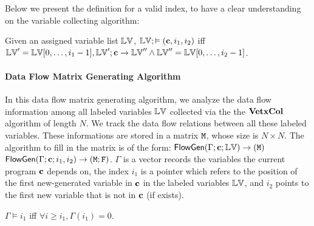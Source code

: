 %
Below we present the definition for a valid index, to have a clear understanding on the variable collecting algorithm:
%
%
{
\begin{defn}
Given an assigned variable list $\mathbb{LV}$, $\mathbb{LV}; \vDash ({\boldsymbol{\mathbf{c}}},i_1,i_2)$ iff 
$\mathbb{LV}' = \mathbb{LV}[0,\ldots, i_1-1], \mathbb{LV}';{\boldsymbol{\mathbf{c}}} \to \mathbb{LV}'' \land \mathbb{LV}'' = \mathbb{LV}[0, \ldots, i_2-1] $.  
\end{defn}}
%
%
\paragraph{Data Flow Matrix Generating Algorithm}
%
In this data flow matrix generating algorithm, we analyze the data flow information among all labeled variables $\mathbb{LV}$ collected via the the $\bf{VetxCol}$ algorithm of length $N$.
%
We track the data flow relations between all these labeled variables. These informations are stored in a matrix $\mathtt{M}$, whose size is $N \times N$. 
%
The algorithm to fill in the matrix is of the form: 
{$\mathsf{FlowGen}{(\Gamma ; {\boldsymbol{\mathbf{c}}} ; \mathbb{LV})}\to {(\ensuremath{\mathtt{M}})}$}
$\mathsf{FlowGen}{(\Gamma ; {\boldsymbol{\mathbf{c}}} ; i_1, i_2)}\to {(\ensuremath{\mathtt{M}}; \ensuremath{\mathtt{F}})}$. 
$\Gamma$ is a vector records the variables the current program ${\boldsymbol{\mathbf{c}}}$ depends on, the index $i_1$ is a pointer which refers to the position of the first new-generated variable in ${\boldsymbol{\mathbf{c}}}$ in the labeled variables $\mathbb{LV}$, and $i_2$ points to the first new variable that is not in ${\boldsymbol{\mathbf{c}}}$ (if exists). 
%
%
{
\begin{defn}
$\Gamma \vDash i_1$ iff $\forall i \geq i_1, \Gamma(i_1)=0 $.  
\end{defn}
}
%
